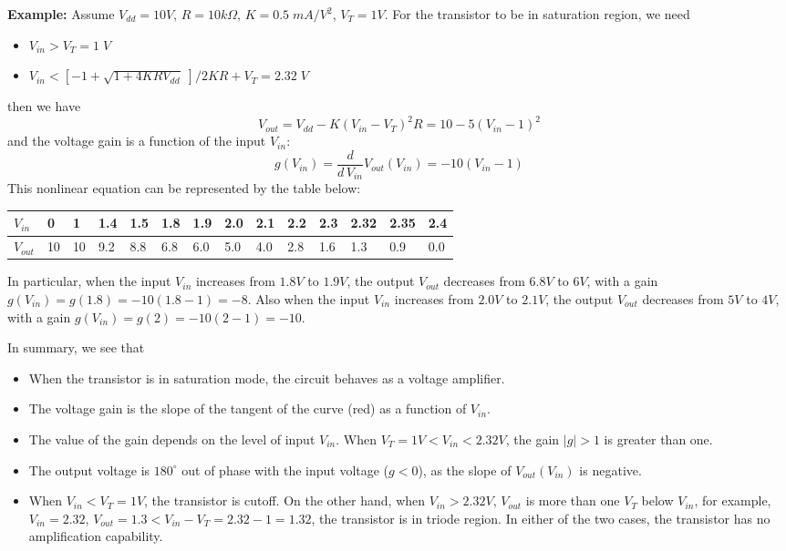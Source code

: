{\bf Example:} Assume $V_{dd}=10V$, $R=10 k\Omega$, $K=0.5\;mA/V^2$, $V_T=1V$.
For the transistor to be in saturation region, we need
\begin{itemize}
\item $V_{in}>V_T=1\;V$ 
\item $V_{in}<[-1+\sqrt{1+4KRV_{dd}}\;]/2KR+V_T=2.32\;V $
\end{itemize}
then we have
\[ V_{out}=V_{dd}-K(V_{in}-V_T)^2 R=10-5(V_{in}-1)^2 \]
and the voltage gain is a function of the input $V_{in}$:
\[ g(V_{in})=\frac{d}{d\,V_{in}} V_{out}(V_{in})=-10(V_{in}-1) \]
This nonlinear equation can be represented by the table below:
\begin{tabular}{l | lllllllllllll} 
$V_{in} $ & 0  & 1  & 1.4 & 1.5 & 1.8 & 1.9 & 2.0 & 2.1 & 2.2 & 2.3 & 2.32 & 2.35 & 2.4 \\ \hline
$V_{out}$ & 10 & 10 & 9.2 & 8.8 & 6.8 & 6.0 & 5.0 & 4.0 & 2.8 & 1.6 & 1.3  & 0.9  & 0.0 
\end{tabular}
In particular, when the input $V_{in}$ increases from $1.8V$ to $1.9V$, the output 
$V_{out}$ decreases from $6.8V$ to $6V$, with a gain $g(V_{in})=g(1.8)=-10(1.8-1)=-8$.
Also when the input $V_{in}$ increases from $2.0V$ to $2.1V$, the output $V_{out}$ 
decreases from $5V$ to $4V$, with a gain $g(V_{in})=g(2)=-10(2-1)=-10$. 


In summary, we see that
\begin{itemize}
\item When the transistor is in saturation mode, the circuit behaves as a voltage amplifier.
\item The voltage gain is the slope of the tangent of the curve (red) as a function of $V_{in}$.
\item The value of the gain depends on the level of input $V_{in}$. When 
  $V_T=1V<V_{in}<2.32V$, the gain $|g|>1$ is greater than one.
\item The output voltage is $180^\circ$ out of phase with the input voltage ($g<0$),
  as the slope of $V_{out}(V_{in})$ is negative.
\item When $V_{in}<V_T=1V$, the transistor is cutoff.  On the other hand, when 
  $V_{in}>2.32V$, $V_{out}$ is more than one $V_T$ below $V_{in}$, for example, 
  $V_{in}=2.32$, $V_{out}=1.3<V_{in}-V_T=2.32-1=1.32$, the transistor is in triode
  region. In either of the two cases, the transistor has no amplification capability.
\end{itemize}

